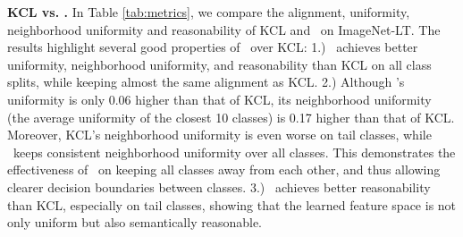 \begin{table}[h]
\caption{\name~achieves better uniformity, neighborhood uniformity and reasonability than KCL on ImageNet-LT, while keeping almost the same alignment. The $k$ for neighborhood uniformity and reasonability is set to 10. $\uparrow$ indicates larger is better, whereas $\downarrow$ indicates smaller is better.}
\vspace{-5mm}
\label{tab:metrics}
\begin{center}
\end{center}
\vspace{-15pt}
\end{table}

\textbf{KCL vs. \name.} In Table \ref{tab:metrics}, we compare the alignment, uniformity, neighborhood uniformity and reasonability of KCL and \name~on ImageNet-LT. The results highlight several good properties of \name~over KCL: 1.) \name~achieves better uniformity, neighborhood uniformity, and reasonability than KCL on all class splits, while keeping almost the same alignment as KCL. 2.) Although \name's uniformity is only 0.06 higher than that of KCL, its neighborhood uniformity (the average uniformity of the closest 10 classes) is 0.17 higher than that of KCL. Moreover, KCL's neighborhood uniformity is even worse on tail classes, while \name~keeps consistent neighborhood uniformity over all classes. This demonstrates the effectiveness of \name~on keeping all classes away from each other, and thus allowing clearer decision boundaries between classes. 3.) \name~achieves better reasonability than KCL, especially on tail classes, showing that the learned feature space is not only uniform but also semantically reasonable.

